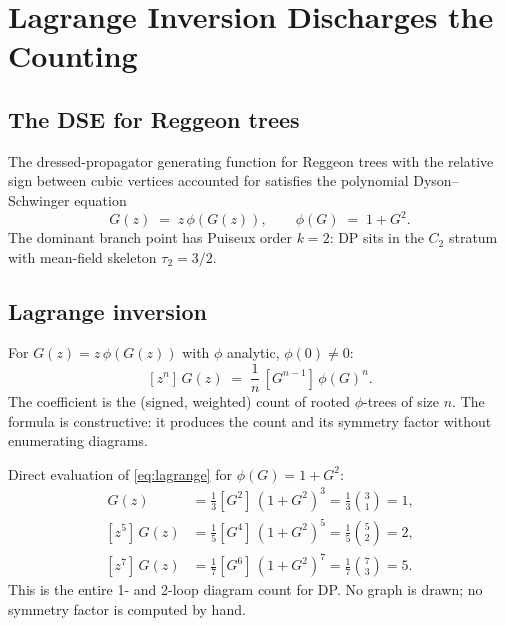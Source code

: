 \documentclass[11pt,a4paper]{article}
\theoremstyle{definition}
\theoremstyle{plain}
\begin{document}
\section{Lagrange Inversion Discharges the Counting}
\label{sec:lagrange}

\subsection{The DSE for Reggeon trees}

\begin{cfacbox}
The dressed-propagator generating function for Reggeon trees with the
relative sign between cubic vertices accounted for satisfies the
polynomial Dyson--Schwinger equation \cite{Amarteifio2026,AmarteifioCFAC2026}
\begin{equation}\label{eq:dse-dp}
  \boxed{\;G(z) \;=\; z\,\phi(G(z)), \qquad \phi(G) \;=\; 1 + G^2.\;}
\end{equation}
The dominant branch point has Puiseux order $k = 2$: DP sits in the
$C_2$ stratum with mean-field skeleton $\tau_2 = 3/2$.
\end{cfacbox}

\subsection{Lagrange inversion}

\begin{acbox}
For $G(z) = z\,\phi(G(z))$ with $\phi$ analytic, $\phi(0) \neq 0$:
\begin{equation}\label{eq:lagrange}
  [z^n]\,G(z) \;=\; \frac{1}{n}\,[G^{n-1}]\,\phi(G)^n.
\end{equation}
The coefficient is the (signed, weighted) count of rooted
$\phi$-trees of size $n$.  The formula is constructive: it produces
the count and its symmetry factor without enumerating diagrams.
\end{acbox}

\begin{cfacbox}
Direct evaluation of \eqref{eq:lagrange} for $\phi(G) = 1 + G^2$:
\begin{align}
  [z^3]\,G(z) &= \tfrac{1}{3}[G^2]\,(1+G^2)^3 = \tfrac{1}{3}\binom{3}{1} = 1,\\
  [z^5]\,G(z) &= \tfrac{1}{5}[G^4]\,(1+G^2)^5 = \tfrac{1}{5}\binom{5}{2} = 2,\\
  [z^7]\,G(z) &= \tfrac{1}{7}[G^6]\,(1+G^2)^7 = \tfrac{1}{7}\binom{7}{3} = 5.
\end{align}
This is the entire 1- and 2-loop diagram count for DP.  No graph is
drawn; no symmetry factor is computed by hand.
\end{cfacbox}
\end{document}
